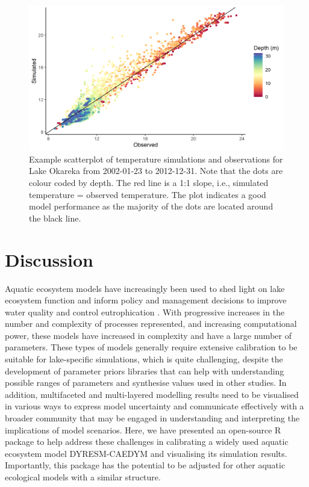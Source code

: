 \begin{figure}[htbp]
    \centering
    \includegraphics[scale=0.78]{Figure7.png}
    \caption{Example scatterplot of temperature simulations and observations for Lake Okareka from 2002-01-23 to 2012-12-31. Note that the dots are colour coded by depth. The red line is a 1:1 slope, i.e., simulated temperature = observed temperature. The plot indicates a good model performance as the majority of the dots are located around the black line.}
    \label{figure7}
\end{figure}

\section{Discussion}

Aquatic ecosystem models have increasingly been used to shed light on lake ecosystem function \citep{scheffer2001catastrophic} and inform policy and management decisions to improve water quality and control eutrophication \citep{wang2012flickering}. With progressive increases in the number and complexity of processes represented, and increasing computational power, these models have increased in complexity and have a large number of parameters. These types of models generally require extensive calibration to be suitable for lake-specific simulations, which is quite challenging, despite the development of parameter priors libraries \citep{robson2018towards} that can help with understanding possible ranges of parameters and synthesise values used in other studies. In addition, multifaceted and multi-layered modelling results need to be visualised in various ways to express model uncertainty and communicate effectively with a broader community that may be engaged in understanding and interpreting the implications of model scenarios. Here, we have presented an open-source R package  to help address these challenges in calibrating a widely used aquatic ecosystem model DYRESM-CAEDYM and visualising its simulation results. Importantly, this package has the potential to be adjusted for other aquatic ecological models with a similar structure.\par

